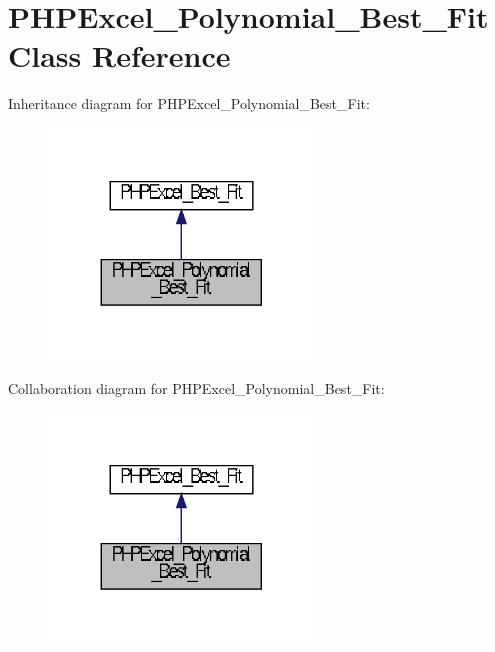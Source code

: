 \section{P\+H\+P\+Excel\+\_\+\+Polynomial\+\_\+\+Best\+\_\+\+Fit Class Reference}
\label{class_p_h_p_excel___polynomial___best___fit}


Inheritance diagram for P\+H\+P\+Excel\+\_\+\+Polynomial\+\_\+\+Best\+\_\+\+Fit\+:\nopagebreak
\begin{figure}[H]
\begin{center}
\leavevmode
\includegraphics[width=200pt]{class_p_h_p_excel___polynomial___best___fit__inherit__graph}
\end{center}
\end{figure}


Collaboration diagram for P\+H\+P\+Excel\+\_\+\+Polynomial\+\_\+\+Best\+\_\+\+Fit\+:\nopagebreak
\begin{figure}[H]
\begin{center}
\leavevmode
\includegraphics[width=200pt]{class_p_h_p_excel___polynomial___best___fit__coll__graph}
\end{center}
\end{figure}
